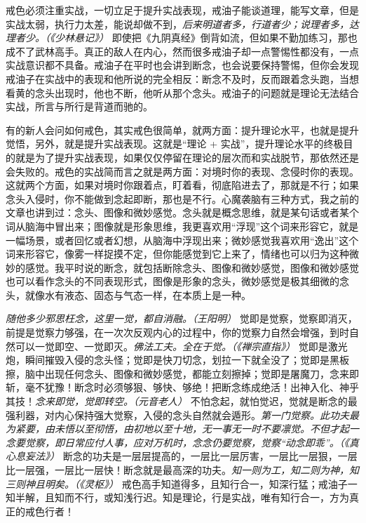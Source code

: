 戒色必须注重实战，一切立足于提升实战表现，戒油子能谈道理，能写文章，但是实战太弱，执行力太差，能说却做不到，\textit{后来明道者多，行道者少；说理者多，达理者少。（《少林悬记》）} 即使把《九阴真经》倒背如流，但如果不勤加练习，那也成不了武林高手。真正的敌人在内心，然而很多戒油子却一点警惕性都没有，一点实战意识都不具备。戒油子在平时也会讲到断念，也会说要保持警惕，但你会发现戒油子在实战中的表现和他所说的完全相反：断念不及时，反而跟着念头跑，当想看黄的念头出现时，他也不断，他听从那个念头。戒油子的问题就是理论无法结合实战，所言与所行是背道而驰的。

有的新人会问如何戒色，其实戒色很简单，就两方面：提升理论水平，也就是提升觉悟，另外，就是提升实战表现。这就是“理论 + 实战”，提升理论水平的终极目的就是为了提升实战表现，如果仅仅停留在理论的层次而和实战脱节，那依然还是会失败的。戒色的实战简而言之就是两方面：对境时你的表现、念侵时你的表现。这就两个方面，如果对境时你跟着点，盯着看，彻底陷进去了，那就是不行；如果念头入侵时，你不能做到念起即断，那也是不行。心魔袭脑有三种方式，我之前的文章也讲到过：念头、图像和微妙感觉。念头就是概念思维，就是某句话或者某个词从脑海中冒出来；图像就是形象思维，我更喜欢用“浮现”这个词来形容它，就是一幅场景，或者回忆或者幻想，从脑海中浮现出来；微妙感觉我喜欢用“逸出”这个词来形容它，像雾一样捉摸不定，但你能感觉到它上来了，情绪也可以归为这种微妙的感觉。我平时说的断念，就包括断除念头、图像和微妙感觉，图像和微妙感觉也可以看作念头的不同表现形式，图像是形象的念头，微妙感觉是极其细微的念头，就像水有液态、固态与气态一样，在本质上是一种。

\textit{随他多少邪思枉念，这里一觉，都自消融。（王阳明）} 觉即是觉察，觉察即消灭，前提是觉察力够强，在一次次反观内心的过程中，你的觉察力自然会增强，到时自然可以一觉即空、一觉即灭。\textit{佛法工夫。全在于觉。（《禅宗直指》）} 觉即是激光炮，瞬间摧毁入侵的念头怪；觉即是快刀切念，划拉一下就全没了；觉即是黑板擦，脑中出现任何念头、图像和微妙感觉，都能立刻擦掉；觉即是屠魔刀，念来即斩，毫不犹豫！断念时必须够狠、够快、够绝！把断念练成绝活！出神入化、神乎其技！\textit{念来即觉，觉即转空。（元音老人）} 不怕念起，就怕觉迟，觉就是断念的最强利器，对内心保持强大觉察，入侵的念头自然就会遁形。\textit{第一门觉察。此功夫最为紧要，由未悟以至彻悟，由初地以至十地，无一事无一时不要凛觉。不但才起一念要觉察，即日常应付人事，应对万机时，念念仍要觉察，觉察“动念即乖”。（《真心息妄法》）} 断念的功夫是一层层提高的，一层比一层厉害，一层比一层狠，一层比一层强，一层比一层快！断念就是最高深的功夫。\textit{知一则为工，知二则为神，知三则神且明矣。（《灵枢》）} 戒色高手知道得多，且知行合一，知深行猛；戒油子一知半解，且知而不行，或知浅行迟。知是理论，行是实战，唯有知行合一，方为真正的戒色行者！

